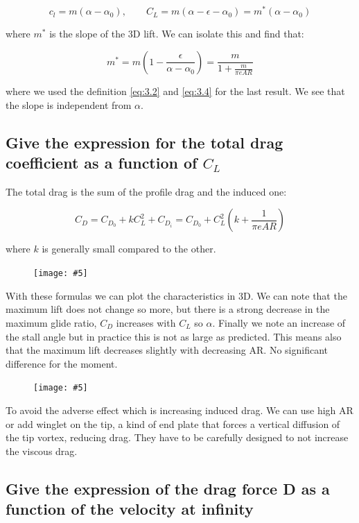 \documentclass[british,french,11pt, a4paper, openany]{article}
\newcommand{\wrapfig}[6]{%
	\begin{figure}%
		\vspace{-5mm}%
		\texttt{[image: \#5]}%
		\captionof{figure}{}%
		\label{#6}%
	\end{figure}%
}
\begin{document}
\begin{equation}
c_l = m(\alpha - \alpha _0), \qquad C_L = m(\alpha - \epsilon - \alpha _0) = m^* (\alpha - \alpha _0)
\label{eq:3.4}
\end{equation}

where $m^*$ is the slope of the 3D lift. We can isolate this and find that:

\begin{equation}
m^* = m\left( 1 - \frac{\epsilon}{\alpha - \alpha _0} \right) = \frac{m}{1+\frac{m}{\pi e AR}} 
\end{equation}

where we used the definition \eqref{eq:3.2} and \eqref{eq:3.4} for the last result. We see that the slope is independent from $\alpha$. 

\subsection{Give the expression for the total drag coefficient as a function of $C_L$}

The total drag is the sum of the profile drag and the induced one:

\begin{equation}
C_D = C_{D_0} + kC_L^2 + C_{D_i} = C_{D_0} + C_L^2 \left( k + \frac{1}{\pi e AR}\right)
\end{equation}	 

where $k$ is generally small compared to the other. 

\wrapfig{8}{l}{5.5}{0.08}{ch3/8}{fig:3.8}
With these formulas we can plot the characteristics in 3D. We can note that the maximum lift does not change so more, but there is a strong decrease in the maximum glide ratio, $C_D$ increases with $C_L$ so $\alpha$. Finally we note an increase of the stall angle but in practice this is not as large as predicted. This means also that the maximum lift decreases slightly with decreasing AR. No significant difference for the moment. 

\wrapfig{5}{l}{5}{0.1}{ch3/9}{fig:3.9}
To avoid the adverse effect which is increasing induced drag. We can use high AR or add winglet on the tip, a kind of end plate that forces a vertical diffusion of the tip vortex, reducing drag. They have to be carefully designed to not increase the viscous drag. 

\subsection{Give the expression of the drag force D as a function of the velocity at infinity}
\end{document}
